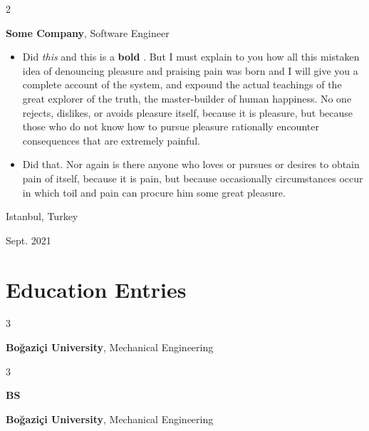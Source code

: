 \documentclass[10pt, letterpaper]{article}
\newenvironment{highlights}{
    \begin{itemize}[
        topsep=0.10 cm,
        parsep=0.10 cm,
        partopsep=0pt,
        itemsep=0pt,
        leftmargin=0.4 cm + 10pt
    ]
}{
    \end{itemize}
} %
\newenvironment{twocolentry}[2][]{
    \onecolentry
    \def\secondColumn{#2}
    \setcolumnwidth{\fill, 4.5 cm}
    \begin{paracol}{2}
}{
    \switchcolumn \raggedleft \secondColumn
    \end{paracol}
    \endonecolentry
} %
\newenvironment{threecolentry}[3][]{
    \onecolentry
    \def\thirdColumn{#3}
    \setcolumnwidth{1 cm, \fill, 4.5 cm}
    \begin{paracol}{3}
    {\raggedright #2} \switchcolumn
}{
    \switchcolumn \raggedleft \thirdColumn
    \end{paracol}
    \endonecolentry
} %
\let\hrefWithoutArrow\href
\renewcommand{\href}[2]{\hrefWithoutArrow{#1}{\mbox{\ifthenelse{\equal{#2}{}}{ }{#2 }\raisebox{.15ex}{\footnotesize \faExternalLink*}}}}
\begin{document}
        \vspace{0.2 cm}

        \begin{twocolentry}{
            Istanbul, Turkey

        Sept. 2021
        }
            \textbf{Some \textnormal{Company}}, Software Engineer
            \begin{highlights}
                \item Did \textit{this} and this is a \textbf{bold} \href{https://example.com}{link}. But I must explain to you how all this mistaken idea of denouncing pleasure and praising pain was born and I will give you a complete account of the system, and expound the actual teachings of the great explorer of the truth, the master-builder of human happiness. No one rejects, dislikes, or avoids pleasure itself, because it is pleasure, but because those who do not know how to pursue pleasure rationally encounter consequences that are extremely painful.
                \item Did that. Nor again is there anyone who loves or pursues or desires to obtain pain of itself, because it is pain, but because occasionally circumstances occur in which toil and pain can procure him some great pleasure.
            \end{highlights}
        \end{twocolentry}



    
    \section{Education Entries}

        
        \begin{threecolentry}{\textbf{}}{
            
        }
            \textbf{Boğaziçi University}, Mechanical Engineering
        \end{threecolentry}

        \vspace{0.2 cm}

        \begin{threecolentry}{\textbf{BS}}{
            
        }
            \textbf{Boğaziçi University}, Mechanical Engineering
        \end{threecolentry}

        \vspace{0.2 cm}
\end{document}
